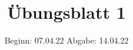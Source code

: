 

\title{Übungsblatt 1}
\date{%
  Beginn: 07.04.22
  \hspace{3em}
  Abgabe: 14.04.22
}



\maketitle
\thispagestyle{empty}
\tableofcontents
\newpage






